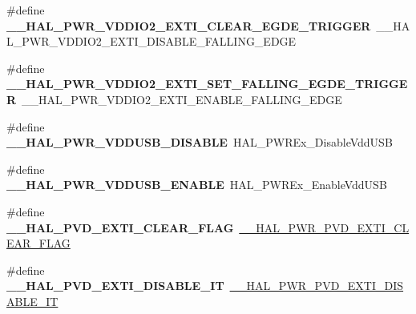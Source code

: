 \begin{DoxyCompactItemize}
\item 
\hypertarget{group___h_a_l___p_w_r___aliased___macros_ga93b3f07014857ba319c24a7e3e8b7ed0}{\#define {\bfseries \-\_\-\-\_\-\-H\-A\-L\-\_\-\-P\-W\-R\-\_\-\-V\-D\-D\-I\-O2\-\_\-\-E\-X\-T\-I\-\_\-\-C\-L\-E\-A\-R\-\_\-\-E\-G\-D\-E\-\_\-\-T\-R\-I\-G\-G\-E\-R}~\-\_\-\-\_\-\-H\-A\-L\-\_\-\-P\-W\-R\-\_\-\-V\-D\-D\-I\-O2\-\_\-\-E\-X\-T\-I\-\_\-\-D\-I\-S\-A\-B\-L\-E\-\_\-\-F\-A\-L\-L\-I\-N\-G\-\_\-\-E\-D\-G\-E}\label{group___h_a_l___p_w_r___aliased___macros_ga93b3f07014857ba319c24a7e3e8b7ed0}

\item 
\hypertarget{group___h_a_l___p_w_r___aliased___macros_gab5cb9dc5b115d7af7a361bf073af54b4}{\#define {\bfseries \-\_\-\-\_\-\-H\-A\-L\-\_\-\-P\-W\-R\-\_\-\-V\-D\-D\-I\-O2\-\_\-\-E\-X\-T\-I\-\_\-\-S\-E\-T\-\_\-\-F\-A\-L\-L\-I\-N\-G\-\_\-\-E\-G\-D\-E\-\_\-\-T\-R\-I\-G\-G\-E\-R}~\-\_\-\-\_\-\-H\-A\-L\-\_\-\-P\-W\-R\-\_\-\-V\-D\-D\-I\-O2\-\_\-\-E\-X\-T\-I\-\_\-\-E\-N\-A\-B\-L\-E\-\_\-\-F\-A\-L\-L\-I\-N\-G\-\_\-\-E\-D\-G\-E}\label{group___h_a_l___p_w_r___aliased___macros_gab5cb9dc5b115d7af7a361bf073af54b4}

\item 
\hypertarget{group___h_a_l___p_w_r___aliased___macros_ga203b7ebde33c1eb9c99f0ac45fa521e7}{\#define {\bfseries \-\_\-\-\_\-\-H\-A\-L\-\_\-\-P\-W\-R\-\_\-\-V\-D\-D\-U\-S\-B\-\_\-\-D\-I\-S\-A\-B\-L\-E}~H\-A\-L\-\_\-\-P\-W\-R\-Ex\-\_\-\-Disable\-Vdd\-U\-S\-B}\label{group___h_a_l___p_w_r___aliased___macros_ga203b7ebde33c1eb9c99f0ac45fa521e7}

\item 
\hypertarget{group___h_a_l___p_w_r___aliased___macros_ga56a0796742be5992269988f4509011fe}{\#define {\bfseries \-\_\-\-\_\-\-H\-A\-L\-\_\-\-P\-W\-R\-\_\-\-V\-D\-D\-U\-S\-B\-\_\-\-E\-N\-A\-B\-L\-E}~H\-A\-L\-\_\-\-P\-W\-R\-Ex\-\_\-\-Enable\-Vdd\-U\-S\-B}\label{group___h_a_l___p_w_r___aliased___macros_ga56a0796742be5992269988f4509011fe}

\item 
\hypertarget{group___h_a_l___p_w_r___aliased___macros_ga534279f1d4354f4372991fe757acad7c}{\#define {\bfseries \-\_\-\-\_\-\-H\-A\-L\-\_\-\-P\-V\-D\-\_\-\-E\-X\-T\-I\-\_\-\-C\-L\-E\-A\-R\-\_\-\-F\-L\-A\-G}~\hyperlink{group___p_w_r___exported___macros_gac0fb2218bc050f5d8fdb1a3f28590352}{\-\_\-\-\_\-\-H\-A\-L\-\_\-\-P\-W\-R\-\_\-\-P\-V\-D\-\_\-\-E\-X\-T\-I\-\_\-\-C\-L\-E\-A\-R\-\_\-\-F\-L\-A\-G}}\label{group___h_a_l___p_w_r___aliased___macros_ga534279f1d4354f4372991fe757acad7c}

\item 
\hypertarget{group___h_a_l___p_w_r___aliased___macros_gaaeb62592dbf02f8aa76ac2941090e0ed}{\#define {\bfseries \-\_\-\-\_\-\-H\-A\-L\-\_\-\-P\-V\-D\-\_\-\-E\-X\-T\-I\-\_\-\-D\-I\-S\-A\-B\-L\-E\-\_\-\-I\-T}~\hyperlink{group___p_w_r___exported___macros_gad240d7bf8f15191b068497b9aead1f1f}{\-\_\-\-\_\-\-H\-A\-L\-\_\-\-P\-W\-R\-\_\-\-P\-V\-D\-\_\-\-E\-X\-T\-I\-\_\-\-D\-I\-S\-A\-B\-L\-E\-\_\-\-I\-T}}\label{group___h_a_l___p_w_r___aliased___macros_gaaeb62592dbf02f8aa76ac2941090e0ed}


\end{DoxyCompactItemize}
